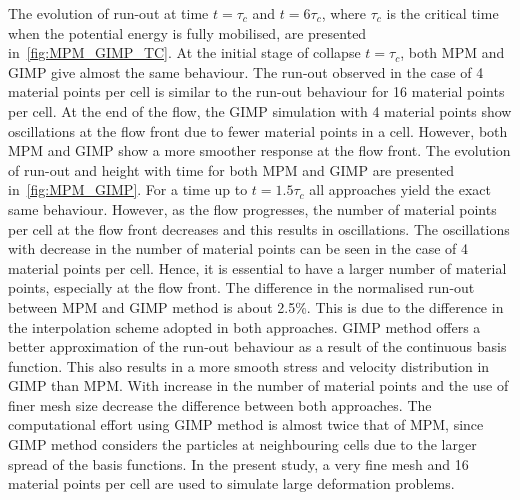 The evolution of run-out at time $t=\tau_c$ and $t=6\tau_c$, where $\tau_c$ is 
the critical time when the potential energy is fully mobilised, are presented 
in~\cref{fig:MPM_GIMP_TC}. At the initial stage of collapse $t=\tau_c$, both 
MPM and GIMP give almost the same behaviour. The run-out observed in the case 
of 4 material points per cell is similar to the run-out behaviour for 16 
material points per cell. At the end of the flow, the GIMP simulation with 4 
material points show oscillations at the flow front due to fewer material 
points in a cell. However, both MPM and GIMP show a more smoother response at 
the flow front. The evolution of run-out and height with time for both MPM and 
GIMP are presented in~\cref{fig:MPM_GIMP}. For a time up to $t=1.5\tau_c$ all 
approaches yield the exact same behaviour. However, as the flow progresses, the 
number of material points per cell at the flow front decreases and this results 
in oscillations. The oscillations with decrease in the number of material 
points can be seen in the case of 4 material points per cell. Hence, it is 
essential to have a larger number of material points, especially at the flow 
front. The difference in the normalised run-out between MPM and GIMP method is 
about 2.5\%. This is due to the difference in the interpolation scheme adopted 
in both approaches. GIMP method offers a better approximation of the run-out 
behaviour as a result of the continuous basis function. This also results in a 
more smooth stress and velocity distribution in GIMP than MPM. With increase in 
the number of material points and the use of finer mesh size decrease the 
difference between both approaches. The computational effort using GIMP method 
is almost twice that of MPM, since GIMP method considers the particles at 
neighbouring cells due to the larger spread of the basis functions. In the 
present study, a very fine mesh and 16 material points per cell are used to 
simulate large deformation problems. 


